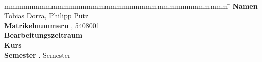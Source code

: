 \begin{titlepage}
\begin{center}
		\vspace*{12mm}	{\large\textbf{\arbeit}}\\
        \vspace*{12mm}	\artikelstudiengang{} \studiengang\\
        \vspace*{3mm}   \anderdh{} \dhbw\\
		\vspace*{12mm}	\von\\
		\vspace*{3mm}	{\large\textbf{\autor}}\\
		\vspace*{12mm}	\datumAbgabe\\
	\end{center}
	\vfill
	\begin{spacing}{1.2}
	\begin{tabbing}
		mmmmmmmmmmmmmmmmmmmmmmmmmmmmmmmmmmmmmm  \= \kill
		\textbf{Namen}                          \> Tobias Dorra, Philipp Pütz\\
		\textbf{Matrikelnummern}                \> , 5408001\\
		\textbf{Bearbeitungszeitraum}           \>  \zeitraum\\
		\textbf{Kurs}               			\>  \kurs\\ %
		\textbf{Semester}                       . Semester\\
	\end{tabbing}
	\end{spacing}
\end{titlepage}

